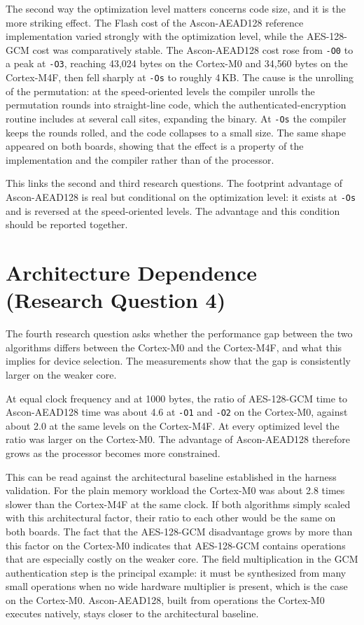 The second way the optimization level matters concerns code size, and it is the
more striking effect.
The Flash cost of the Ascon-AEAD128 reference implementation varied strongly
with the optimization level, while the AES-128-GCM cost was comparatively
stable.
The Ascon-AEAD128 cost rose from \texttt{-O0} to a peak at \texttt{-O3},
reaching 43{,}024 bytes on the Cortex-M0 and 34{,}560 bytes on the Cortex-M4F,
then fell sharply at \texttt{-Os} to roughly 4\,KB.
The cause is the unrolling of the permutation: at the speed-oriented levels the
compiler unrolls the permutation rounds into straight-line code, which the
authenticated-encryption routine includes at several call sites, expanding the
binary.
At \texttt{-Os} the compiler keeps the rounds rolled, and the code collapses to
a small size.
The same shape appeared on both boards, showing that the effect is a property
of the implementation and the compiler rather than of the processor.

This links the second and third research questions.
The footprint advantage of Ascon-AEAD128 is real but conditional on the
optimization level: it exists at \texttt{-Os} and is reversed at the
speed-oriented levels.
The advantage and this condition should be reported together.

\section{Architecture Dependence (Research Question 4)}

The fourth research question asks whether the performance gap between the two
algorithms differs between the Cortex-M0 and the Cortex-M4F, and what this
implies for device selection.
The measurements show that the gap is consistently larger on the weaker core.

At equal clock frequency and at 1000 bytes, the ratio of AES-128-GCM time to
Ascon-AEAD128 time was about 4.6 at \texttt{-O1} and \texttt{-O2} on the
Cortex-M0, against about 2.0 at the same levels on the Cortex-M4F.
At every optimized level the ratio was larger on the Cortex-M0.
The advantage of Ascon-AEAD128 therefore grows as the processor becomes more
constrained.

This can be read against the architectural baseline established in the harness
validation.
For the plain memory workload the Cortex-M0 was about 2.8 times slower than
the Cortex-M4F at the same clock.
If both algorithms simply scaled with this architectural factor, their ratio to
each other would be the same on both boards.
The fact that the AES-128-GCM disadvantage grows by more than this factor on
the Cortex-M0 indicates that AES-128-GCM contains operations that are
especially costly on the weaker core.
The field multiplication in the GCM authentication step is the principal
example: it must be synthesized from many small operations when no wide
hardware multiplier is present, which is the case on the Cortex-M0.
Ascon-AEAD128, built from operations the Cortex-M0 executes natively, stays
closer to the architectural baseline.

